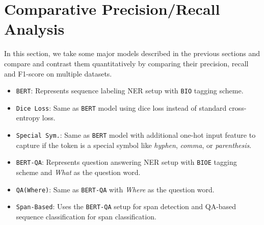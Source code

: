 \section{Comparative Precision/Recall Analysis}
\label{sec:precision_recall_analysis}

In this section, we take some major models described in the previous sections and compare and contrast them quantitatively by comparing their precision, recall and F1-score on multiple datasets.

\begin{itemize}
    \item \texttt{BERT}: Represents sequence labeling NER setup with \texttt{BIO} tagging scheme.
    
    \item \texttt{Dice Loss}: Same as \texttt{BERT} model using dice loss instead of standard cross-entropy loss.
    
    \item \texttt{Special Sym.}: Same as \texttt{BERT} model with additional one-hot input feature to capture if the token is a special symbol like \textit{hyphen}, \textit{comma}, or \textit{parenthesis}.
    
    \item \texttt{BERT-QA}: Represents question answering NER setup with \texttt{BIOE} tagging scheme and \textit{What} as the question word.
    
    \item \texttt{QA(Where)}: Same as \texttt{BERT-QA} with \textit{Where} as the question word.
    
    \item \texttt{Span-Based}: Uses the \texttt{BERT-QA} setup for span detection and QA-based sequence classification for span classification.
\end{itemize}

